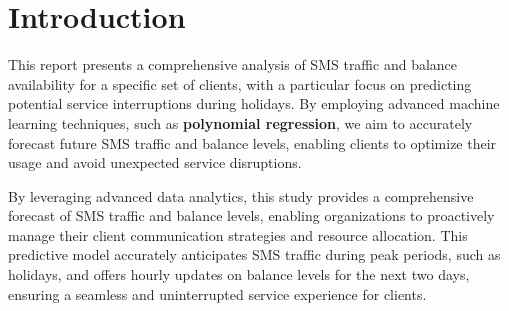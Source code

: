 \documentclass[12pt]{book} %
\begin{document}







{}






\thispagestyle{empty}
\tableofcontents
\thispagestyle{empty}
\clearpage






\setcounter{page}{1}




\chapter{Introduction}
This report presents a comprehensive analysis of SMS traffic and balance availability for a specific set of clients, with a particular focus on predicting potential service interruptions during holidays. By employing advanced machine learning techniques, such as \textbf{polynomial regression}, we aim to accurately forecast future SMS traffic and balance levels, enabling clients to optimize their usage and avoid unexpected service disruptions. 

By leveraging advanced data analytics, this study provides a comprehensive forecast of SMS traffic and balance levels, enabling organizations to proactively manage their client communication strategies and resource allocation. This predictive model accurately anticipates SMS traffic during peak periods, such as holidays, and offers hourly updates on balance levels for the next two days, ensuring a seamless and uninterrupted service experience for clients.
\end{document}
